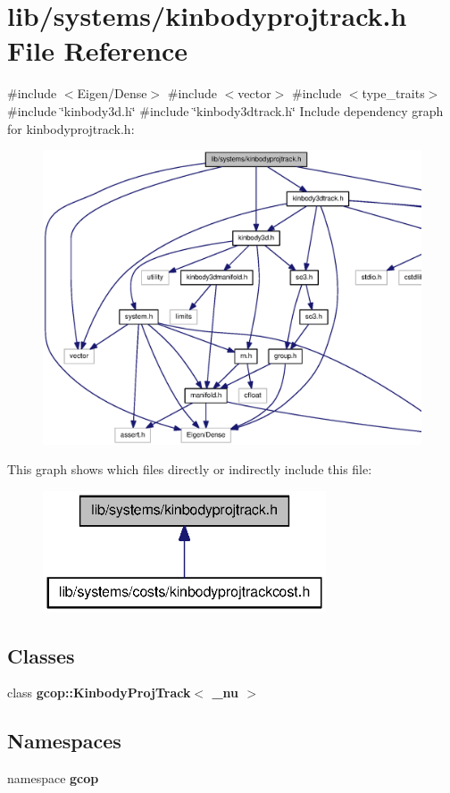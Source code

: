 \section{lib/systems/kinbodyprojtrack.h \-File \-Reference}
\label{kinbodyprojtrack_8h}
{\ttfamily \#include $<$\-Eigen/\-Dense$>$}\*
{\ttfamily \#include $<$vector$>$}\*
{\ttfamily \#include $<$type\-\_\-traits$>$}\*
{\ttfamily \#include \char`\"{}kinbody3d.\-h\char`\"{}}\*
{\ttfamily \#include \char`\"{}kinbody3dtrack.\-h\char`\"{}}\*
\-Include dependency graph for kinbodyprojtrack.\-h\-:\nopagebreak
\begin{figure}[H]
\begin{center}
\leavevmode
\includegraphics[width=350pt]{kinbodyprojtrack_8h__incl}
\end{center}
\end{figure}
\-This graph shows which files directly or indirectly include this file\-:\nopagebreak
\begin{figure}[H]
\begin{center}
\leavevmode
\includegraphics[width=238pt]{kinbodyprojtrack_8h__dep__incl}
\end{center}
\end{figure}
\subsection*{\-Classes}
\begin{DoxyCompactItemize}
\item 
class {\bf gcop\-::\-Kinbody\-Proj\-Track$<$ \-\_\-nu $>$}
\end{DoxyCompactItemize}
\subsection*{\-Namespaces}
\begin{DoxyCompactItemize}
\item 
namespace {\bf gcop}
\end{DoxyCompactItemize}
